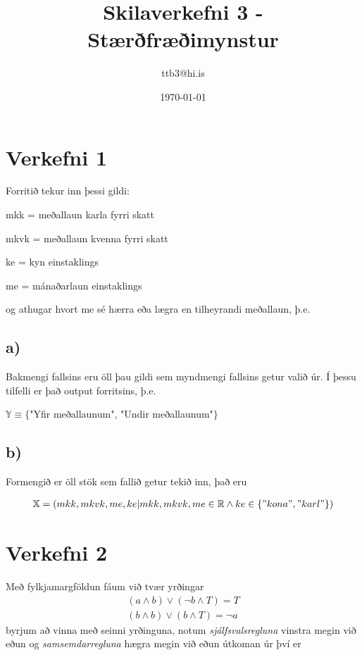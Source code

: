 \documentclass{article}
\title{Skilaverkefni 3 - Stærðfræðimynstur}
\author{ttb3@hi.is}
\date{\today}
\begin{document}
\maketitle

\section*{Verkefni 1}
Forritið tekur inn þessi gildi:
\begin{list}{}{}
    \item mkk = meðallaun karla fyrri skatt
    \item mkvk = meðallaun kvenna fyrri skatt
    \item ke = kyn einstaklings
    \item me = mánaðarlaun einstaklings
\end{list}
og athugar hvort me sé hærra eða lægra en tilheyrandi meðallaun, þ.e.

\subsection*{a)}
Bakmengi fallsins eru öll þau gildi sem myndmengi fallsins getur valið úr. Í þessu tilfelli er það output forritsins, þ.e. 

\begin{center}
    $\mathbb{Y} \equiv \{$"Yfir meðallaunum", "Undir meðallaunum"$\}$
\end{center} 

\subsection*{b)}
Formengið er öll stök sem fallið getur tekið inn, það eru

\begin{align*}
    \mathbb{X} = (mkk,mkvk,me,ke|mkk,mkvk,me\in \mathbb{R} \land ke \in \{"kona","karl" \})
\end{align*} 

\newpage
\section*{Verkefni 2}
Með fylkjamargföldun fáum við tvær yrðingar
\begin{align*}
    (a\land b)\lor(\lnot b\land T)=T\\
    (b\land b)\lor(b\land T)=\lnot a
\end{align*}
byrjum að vinna með seinni yrðinguna, notum \emph{sjálfsvalsregluna} vinstra megin við eðun og \emph{samsemdarregluna} hægra megin við eðun
útkoman úr því er 
\end{document}
